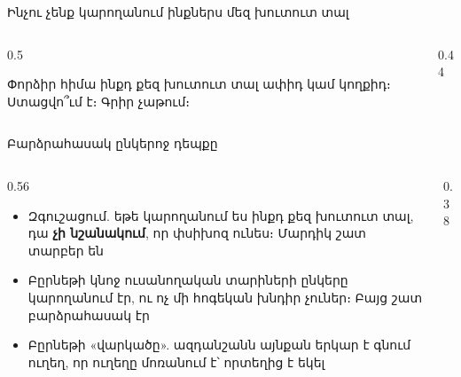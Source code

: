 \begin{frame}{Ինչու չենք կարողանում ինքներս մեզ խուտուտ տալ}
  \begin{columns}[c]
    \begin{column}{0.5\textwidth}
      \begin{tryit}
        Փորձիր հիմա ինքդ քեզ խուտուտ տալ ափիդ կամ կողքիդ։ Ստացվո՞ւմ է։ Գրիր չաթում։
      \end{tryit}
    \end{column}
    \begin{column}{0.44\textwidth}
    \end{column}
  \end{columns}
\end{frame}

\begin{frame}{Բարձրահասակ ընկերոջ դեպքը}
  \begin{columns}[c]
    \begin{column}{0.56\textwidth}
      \begin{itemize}
        \item Զգուշացում. եթե կարողանում ես ինքդ քեզ խուտուտ տալ, դա \textbf{չի նշանակում}, որ փսիխոզ ունես։ Մարդիկ շատ տարբեր են
        \item<2-> Բըրնեթի կնոջ ուսանողական տարիների ընկերը կարողանում էր, ու ոչ մի հոգեկան խնդիր չուներ։ Բայց շատ բարձրահասակ էր
        \item<3-> Բըրնեթի «վարկածը». ազդանշանն այնքան երկար է գնում ուղեղ, որ ուղեղը մոռանում է՝ որտեղից է եկել
      \end{itemize}
    \end{column}
    \begin{column}{0.38\textwidth}
    \end{column}
  \end{columns}
\end{frame}

